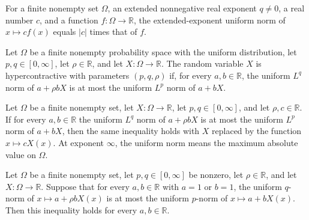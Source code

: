 \begin{theorem}
\label{FABL.uniformLpNormENNReal_const_mul}
\leanok
{}
For a finite nonempty set $\Omega$, an extended nonnegative real exponent $q\ne 0$, a
real number $c$, and a function $f:\Omega\to\mathbb R$, the extended-exponent uniform
norm of $x\mapsto c f(x)$ equals $|c|$ times that of $f$.
\end{theorem}

\begin{definition}
\label{FABL.IsHypercontractiveRandomVariable}
\leanok
{}
Let $\Omega$ be a finite nonempty probability space with the uniform distribution, let
$p,q\in[0,\infty]$, let $\rho\in\mathbb{R}$, and let $X:\Omega\to\mathbb{R}$. The random
variable $X$ is hypercontractive with parameters $(p,q,\rho)$ if, for every
$a,b\in\mathbb{R}$, the uniform $L^q$ norm of $a+\rho bX$ is at most the uniform $L^p$
norm of $a+bX$.
\end{definition}

\begin{theorem}
\label{FABL.IsHypercontractiveRandomVariable.const_mul}
\leanok
{}
Let $\Omega$ be a finite nonempty set, let $X:\Omega\to\mathbb R$, let
$p,q\in[0,\infty]$, and let $\rho,c\in\mathbb R$. If for every $a,b\in\mathbb R$
the uniform $L^q$ norm of $a+\rho bX$ is at most the uniform $L^p$ norm of $a+bX$, then
the same inequality holds with $X$ replaced by the function $x\mapsto cX(x)$. At
exponent $\infty$, the uniform norm means the maximum absolute value on $\Omega$.
\end{theorem}

\begin{theorem}
\label{FABL.IsHypercontractiveRandomVariable.of_normalized}
\leanok
{}
Let $\Omega$ be a finite nonempty set, let $p,q\in[0,\infty]$ be nonzero, let
$\rho\in\mathbb R$, and let $X:\Omega\to\mathbb R$. Suppose that for every
$a,b\in\mathbb R$ with $a=1$ or $b=1$, the uniform $q$-norm of $x\mapsto a+\rho bX(x)$
is at most the uniform $p$-norm of $x\mapsto a+bX(x)$. Then this inequality holds for
every $a,b\in\mathbb R$.
\end{theorem}

